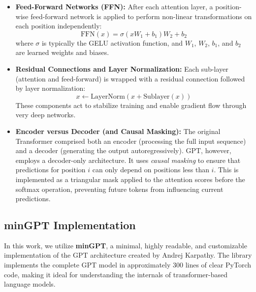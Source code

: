 \begin{itemize}
	\item \textbf{Feed-Forward Networks (FFN):} After each attention layer, a position-wise feed-forward network is applied to perform non-linear transformations on each position independently:
	      \begin{equation}
		      \text{FFN}(x) = \sigma(xW_1 + b_1)W_2 + b_2
	      \end{equation}
	      where $\sigma$ is typically the GELU activation function, and $W_1$, $W_2$, $b_1$, and $b_2$ are learned weights and biases.

	\item \textbf{Residual Connections and Layer Normalization:} Each sub-layer (attention and feed-forward) is wrapped with a residual connection followed by layer normalization:
	      \begin{equation}
		      x \leftarrow \text{LayerNorm}(x + \text{Sublayer}(x))
	      \end{equation}
	      These components act to stabilize training and enable gradient flow through very deep networks.

	\item \textbf{Encoder versus Decoder (and Causal Masking):} The original Transformer comprised both an encoder (processing the full input sequence) and a decoder (generating the output autoregressively). GPT, however, employs a decoder-only architecture. It uses \emph{causal masking} to ensure that predictions for position $i$ can only depend on positions less than $i$. This is implemented as a triangular mask applied to the attention scores before the softmax operation, preventing future tokens from influencing current predictions.
\end{itemize}


\subsection{minGPT Implementation}
\label{sec:mingpt_impl}

In this work, we utilize \textbf{minGPT}, a minimal, highly readable, and customizable implementation of the GPT architecture created by Andrej Karpathy. The library implements the complete GPT model in approximately 300 lines of clear PyTorch code, making it ideal for understanding the internals of transformer-based language models.

